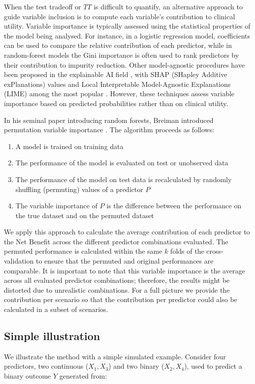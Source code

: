 When the test tradeoff or $TT$ is difficult to quantify, an alternative approach to guide variable inclusion is to compute each variable's contribution to clinical utility. Variable importance is typically assessed using the statistical properties of the model being analysed. For instance, in a logistic regression model, coefficients can be used to compare the relative contribution of each predictor, while in random-forest models the Gini importance is often used to rank predictors by their contribution to impurity reduction. Other model-agnostic procedures have been proposed in the explainable AI field \cite{dwivediExplainableAIXAI2023}, with SHAP (SHapley Additive exPlanations) values and Local Interpretable Model-Agnostic Explanations (LIME) among the most popular \cite{lundbergUnifiedApproachInterpreting2017,ribeiroWhyShouldTrust2016}. However, these techniques assess variable importance based on predicted probabilities rather than on clinical utility.

In his seminal paper introducing random forests, Breiman introduced permutation variable importance \cite{breimanRandomForests2001}. The algorithm proceeds as follows:

\begin{enumerate}
\item A model is trained on training data
\item The performance of the model is evaluated on test or unobserved data
\item The performance of the model on test data is recalculated by randomly shuffling (permuting) values of a predictor $P$
\item The variable importance of $P$ is the difference between the performance on the true dataset and on the permuted dataset
\end{enumerate}

We apply this approach to calculate the average contribution of each predictor to the Net Benefit across the different predictor combinations evaluated. The permuted performance is calculated within the same $k$ folds of the cross-validation to ensure that the permuted and original performances are comparable. It is important to note that this variable importance is the average across all evaluated predictor combinations; therefore, the results might be distorted due to unrealistic combinations. For a full picture we provide the contribution per scenario so that the contribution per predictor could also be calculated in a subset of scenarios.

\subsection{Simple illustration}
\label{sec:simple_il}
 We illustrate the method with a simple simulated example. Consider four predictors, two continuous ($X_1, X_3$) and two binary ($X_2, X_4$), used to predict a binary outcome $Y$ generated from:

